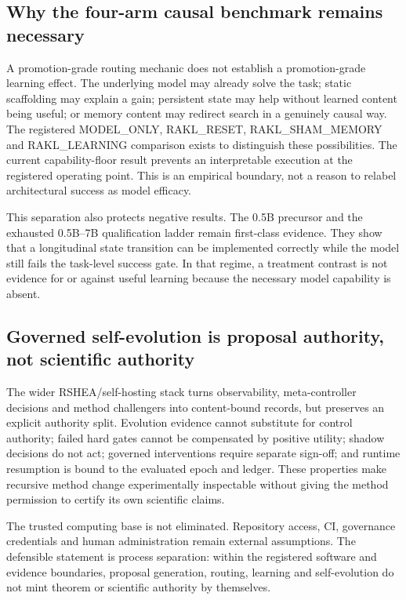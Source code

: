 \subsection{Why the four-arm causal benchmark remains necessary}

A promotion-grade routing mechanic does not establish a promotion-grade learning effect.  The underlying model may already solve the task; static scaffolding may explain a gain; persistent state may help without learned content being useful; or memory content may redirect search in a genuinely causal way.  The registered MODEL\_ONLY, RAKL\_RESET, RAKL\_SHAM\_MEMORY and RAKL\_LEARNING comparison exists to distinguish these possibilities.  The current capability-floor result prevents an interpretable execution at the registered operating point.  This is an empirical boundary, not a reason to relabel architectural success as model efficacy.

This separation also protects negative results.  The 0.5B precursor and the exhausted 0.5B--7B qualification ladder remain first-class evidence.  They show that a longitudinal state transition can be implemented correctly while the model still fails the task-level success gate.  In that regime, a treatment contrast is not evidence for or against useful learning because the necessary model capability is absent.

\subsection{Governed self-evolution is proposal authority, not scientific authority}

The wider RSHEA/self-hosting stack turns observability, meta-controller decisions and method challengers into content-bound records, but preserves an explicit authority split.  Evolution evidence cannot substitute for control authority; failed hard gates cannot be compensated by positive utility; shadow decisions do not act; governed interventions require separate sign-off; and runtime resumption is bound to the evaluated epoch and ledger.  These properties make recursive method change experimentally inspectable without giving the method permission to certify its own scientific claims.

The trusted computing base is not eliminated.  Repository access, CI, governance credentials and human administration remain external assumptions.  The defensible statement is process separation: within the registered software and evidence boundaries, proposal generation, routing, learning and self-evolution do not mint theorem or scientific authority by themselves.

